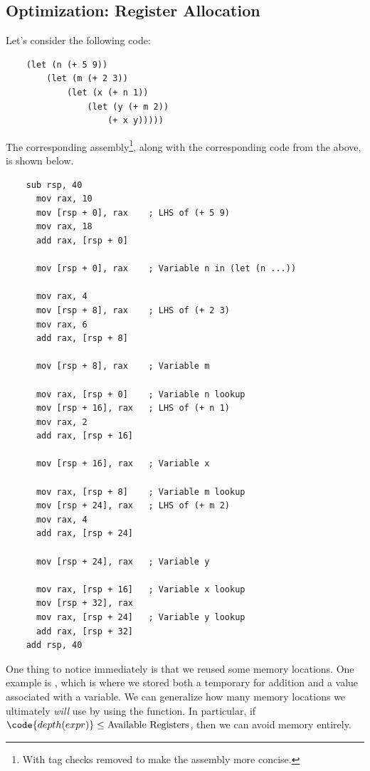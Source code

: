 \subsection{Optimization: Register Allocation}
Let's consider the following code: 
\begin{verbatim}
    (let (n (+ 5 9))
        (let (m (+ 2 3))
            (let (x (+ n 1))
                (let (y (+ m 2))
                    (+ x y)))))\end{verbatim}

The corresponding assembly\footnote{With tag checks removed to make the assembly more concise.}, along with the corresponding code from the above, is shown below.
\begin{verbatim}
    sub rsp, 40
      mov rax, 10
      mov [rsp + 0], rax    ; LHS of (+ 5 9)
      mov rax, 18
      add rax, [rsp + 0]

      mov [rsp + 0], rax    ; Variable n in (let (n ...))

      mov rax, 4
      mov [rsp + 8], rax    ; LHS of (+ 2 3)
      mov rax, 6
      add rax, [rsp + 8]

      mov [rsp + 8], rax    ; Variable m

      mov rax, [rsp + 0]    ; Variable n lookup 
      mov [rsp + 16], rax   ; LHS of (+ n 1)
      mov rax, 2
      add rax, [rsp + 16]

      mov [rsp + 16], rax   ; Variable x

      mov rax, [rsp + 8]    ; Variable m lookup 
      mov [rsp + 24], rax   ; LHS of (+ m 2)
      mov rax, 4
      add rax, [rsp + 24]

      mov [rsp + 24], rax   ; Variable y 

      mov rax, [rsp + 16]   ; Variable x lookup 
      mov [rsp + 32], rax
      mov rax, [rsp + 24]   ; Variable y lookup 
      add rax, [rsp + 32]
    add rsp, 40\end{verbatim}
One thing to notice immediately is that we reused some memory locations. One example is \code{[rsp + 8]}, which is where we stored both a temporary for addition and a value associated with a variable. We can generalize how many memory locations we ultimately \emph{will} use by using the  function. In particular, if $\code{depth(expr)} \leq \text{Available Registers}$, then we can avoid memory entirely.

\bigskip 

